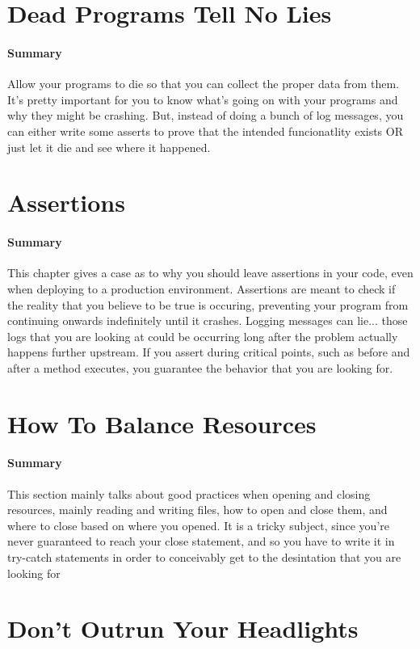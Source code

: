\documentclass{article}
\begin{document}
\section{Dead Programs Tell No Lies}
    \paragraph{Summary} Allow your programs to die so that you can collect the proper data from them. It's pretty important for you to know what's going on with your programs and why they might be crashing. But, instead of doing a bunch of log messages, you can either write some asserts to prove that the intended funcionatlity exists OR just let it die and see where it happened.

\section{Assertions}
    \paragraph{Summary} This chapter gives a case as to why you should leave assertions in your code, even when deploying to a production environment. Assertions are meant to check if the reality that you believe to be true is occuring, preventing your program from continuing onwards indefinitely until it crashes. Logging messages can lie... those logs that you are looking at could be occurring long after the problem actually happens further upstream. If you assert during critical points, such as before and after a method executes, you guarantee the behavior that you are looking for.

\section{How To Balance Resources}
    \paragraph{Summary} This section mainly talks about good practices when opening and closing resources, mainly reading and writing files, how to open and close them, and where to close based on where you opened. It is a tricky subject, since you're never guaranteed to reach your close statement, and so you have to write it in try-catch statements in order to conceivably get to the desintation that you are looking for 

\section{Don't Outrun Your Headlights}
\end{document}
